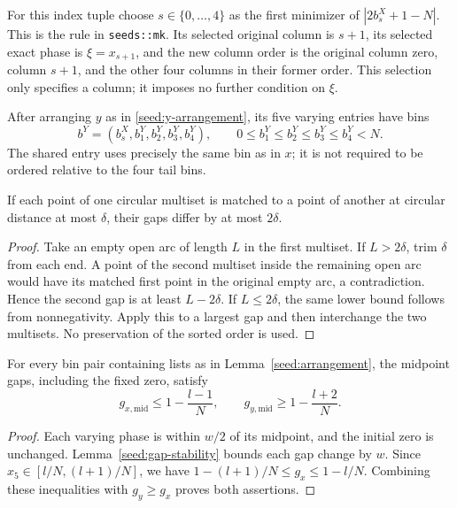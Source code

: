 For this index tuple choose $s\in\{0,\ldots,4\}$ as the first minimizer of
$|2b^X_s+1-N|$.  This is the rule in \texttt{seeds::mk}.  Its selected
original column is $s+1$, its selected exact phase is $\xi=x_{s+1}$, and
the new column order is the original column zero, column $s+1$, and the
other four columns in their former order.  This selection only specifies
a column; it imposes no further condition on $\xi$.

After arranging $y$ as in \eqref{seed:y-arrangement}, its five varying
entries have bins
\[
 b^Y=(b^X_s,b^Y_1,b^Y_2,b^Y_3,b^Y_4),\qquad
 0\le b^Y_1\le b^Y_2\le b^Y_3\le b^Y_4<N.
\]
The shared entry uses precisely the same bin as in $x$; it is not required
to be ordered relative to the four tail bins.

\begin{lemma}
\label{seed:gap-stability}
If each point of one circular multiset is matched to a point of another
at circular distance at most $\delta$, their gaps differ by at most
$2\delta$.
\end{lemma}

\begin{proof}
Take an empty open arc of length $L$ in the first multiset.  If $L>2\delta$,
trim $\delta$ from each end.  A point of the second multiset inside the
remaining open arc would have its matched first point in the original
empty arc, a contradiction.  Hence the second gap is at least
$L-2\delta$.  If $L\le2\delta$, the same lower bound follows from
nonnegativity.  Apply this to a largest gap and then interchange the
two multisets.  No preservation of the sorted order is used.
\end{proof}

\begin{lemma}
\label{seed:gap-filters}
For every bin pair containing lists as in Lemma~\ref{seed:arrangement},
the midpoint gaps, including the fixed zero, satisfy
\begin{equation}
\label{seed:gap-inequalities}
 g_{x,\mathrm{mid}}\le1-\frac{l-1}{N},\qquad
 g_{y,\mathrm{mid}}\ge1-\frac{l+2}{N}.
\end{equation}
\end{lemma}

\begin{proof}
Each varying phase is within $w/2$ of its midpoint, and the initial zero
is unchanged.  Lemma~\ref{seed:gap-stability} bounds each gap change by $w$.
Since $x_5\in[l/N,(l+1)/N]$, we have
$1-(l+1)/N\le g_x\le1-l/N$.  Combining these inequalities with
$g_y\ge g_x$ proves both assertions.
\end{proof}


